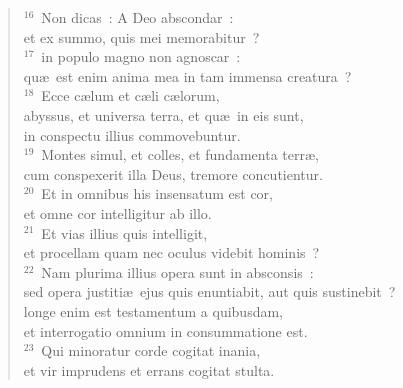 \begin{verse}${}^{16}$~Non dicas~: A Deo abscondar~:\\ et ex summo, quis mei memorabitur~?\\
${}^{17}$~in populo magno non agnoscar~:\\ qu\ae\ est enim anima mea in tam immensa creatura~?\\
${}^{18}$~Ecce c\ae lum et c\ae li c\ae lorum,\\ abyssus, et universa terra, et qu\ae\ in eis sunt,\\ in conspectu illius commovebuntur.\\
${}^{19}$~Montes simul, et colles, et fundamenta terr\ae ,\\ cum conspexerit illa Deus, tremore concutientur.\\
${}^{20}$~Et in omnibus his insensatum est cor,\\ et omne cor intelligitur ab illo.\\
${}^{21}$~Et vias illius quis intelligit,\\ et procellam quam nec oculus videbit hominis~?\\
${}^{22}$~Nam plurima illius opera sunt in absconsis~:\\ sed opera justiti\ae\ ejus quis enuntiabit, aut quis sustinebit~?\\ longe enim est testamentum a quibusdam,\\ et interrogatio omnium in consummatione est.\\
${}^{23}$~Qui minoratur corde cogitat inania,\\ et vir imprudens et errans cogitat stulta.\end{verse}


